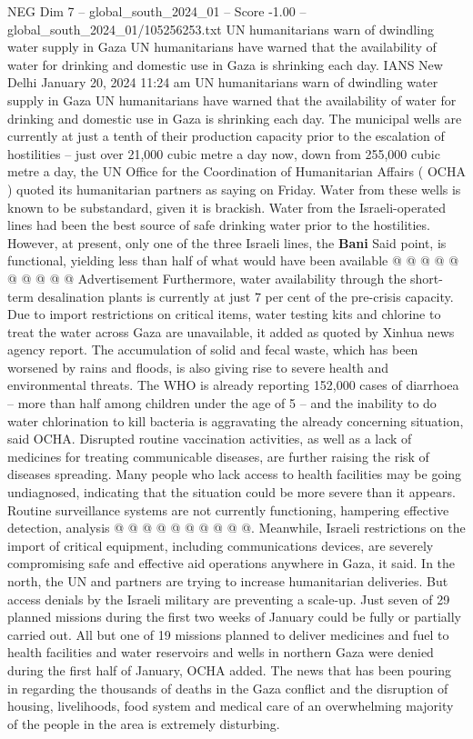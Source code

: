 \begin{textsample}{NEG Dim 7 – global\_south\_2024\_01 – Score -1.00 – global\_south\_2024\_01/105256253.txt}  \label{ex:f7_neg_146}
UN humanitarians warn of dwindling water supply in Gaza UN humanitarians have warned that the availability of water for drinking and domestic use in Gaza is shrinking each day.
IANS New Delhi January 20, 2024 11:24 am UN humanitarians warn of dwindling water supply in Gaza UN humanitarians have warned that the availability of water for drinking and domestic use in Gaza is shrinking each day.
The municipal wells are currently at just a tenth of their production capacity prior to the escalation of hostilities -- just over 21,000 cubic metre a day now, down from 255,000 cubic metre a day, the UN Office for the Coordination of Humanitarian Affairs ( OCHA ) quoted its humanitarian partners as saying on Friday.
Water from these wells is known to be substandard, given it is brackish.
Water from the Israeli-operated lines had been the best source of safe drinking water prior to the hostilities.
However, at present, only one of the three Israeli lines, the \textbf{Bani} Said point, is functional, yielding less than half of what would have been available @ @ @ @ @ @ @ @ @ @ Advertisement Furthermore, water availability through the short-term desalination plants is currently at just 7 per cent of the pre-crisis capacity.
Due to import restrictions on critical items, water testing kits and chlorine to treat the water across Gaza are unavailable, it added as quoted by Xinhua news agency report.
The accumulation of solid and fecal waste, which has been worsened by rains and floods, is also giving rise to severe health and environmental threats.
The WHO is already reporting 152,000 cases of diarrhoea -- more than half among children under the age of 5 -- and the inability to do water chlorination to kill bacteria is aggravating the already concerning situation, said OCHA.
Disrupted routine vaccination activities, as well as a lack of medicines for treating communicable diseases, are further raising the risk of diseases spreading.
Many people who lack access to health facilities may be going undiagnosed, indicating that the situation could be more severe than it appears.
Routine surveillance systems are not currently functioning, hampering effective detection, analysis @ @ @ @ @ @ @ @ @ @.
Meanwhile, Israeli restrictions on the import of critical equipment, including communications devices, are severely compromising safe and effective aid operations anywhere in Gaza, it said.
In the north, the UN and partners are trying to increase humanitarian deliveries.
But access denials by the Israeli military are preventing a scale-up.
Just seven of 29 planned missions during the first two weeks of January could be fully or partially carried out.
All but one of 19 missions planned to deliver medicines and fuel to health facilities and water reservoirs and wells in northern Gaza were denied during the first half of January, OCHA added.
The news that has been pouring in regarding the thousands of deaths in the Gaza conflict and the disruption of housing, livelihoods, food system and medical care of an overwhelming majority of the people in the area is extremely disturbing.

\end{textsample}
